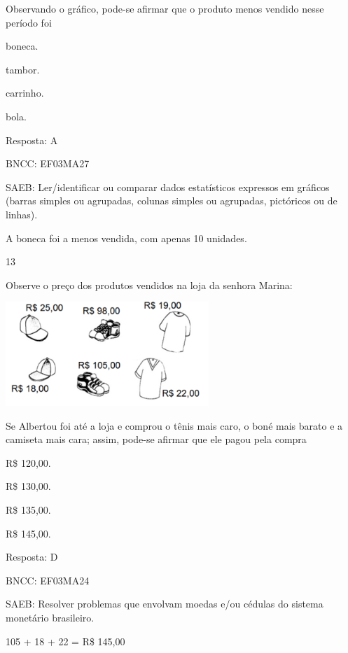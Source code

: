 \begin{escolha}
{\begin{escolha}
{Observando o gráfico, pode-se afirmar que o produto menos vendido nesse período foi

\begin{escolha}

\item
  boneca.
\item
  tambor.
\item
  carrinho.
\item
  bola.
\end{escolha}

Resposta: A

BNCC: EF03MA27

SAEB: Ler/identificar ou comparar dados estatísticos
expressos em gráficos (barras simples ou agrupadas, colunas simples ou
agrupadas, pictóricos ou de linhas).

A boneca foi a menos vendida, com apenas 10 unidades.

\num{13}

Observe o preço dos produtos vendidos na loja da senhora Marina:


\includegraphics[width=3.02451in,height=1.54853in]{media/image138.png}

Se Albertou foi até a loja e comprou o tênis mais caro, o boné mais
barato e a camiseta mais cara; assim, pode-se afirmar que ele pagou pela compra

\begin{escolha}

\item
  R\$ 120,00.
\item
  R\$ 130,00.
\item
  R\$ 135,00.
\item
  R\$ 145,00.
\end{escolha}

Resposta: D

BNCC: EF03MA24

SAEB: Resolver problemas que envolvam moedas e/ou cédulas do
sistema monetário brasileiro.

105 + 18 + 22 = R\$ 145,00

}
\end{escolha}}
\end{escolha}
